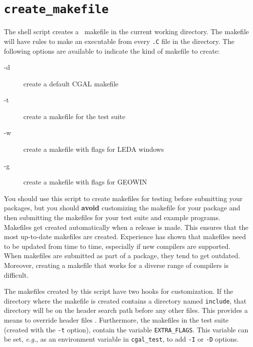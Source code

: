 \section{{\tt create\_makefile}}
\label{sec:create_makefile}

The shell script  creates a \cgal\ makefile
in the current working directory.
The makefile will have rules to make an executable from every {\tt .C} 
file in the directory.  The following options are available 
to indicate the kind of makefile to create:
\begin{description}
\item[-d]   create a default CGAL makefile
\item[-t]   create a makefile for the test suite
\item[-w]   create a makefile with flags for LEDA windows
\item[-g]   create a makefile with flags for GEOWIN
\end{description}

You should use this script to create makefiles for testing before submitting
your packages, but you should {\bf avoid} customizing the makefile for your 
package and then submitting the makefiles for your test suite and example 
programs.
Makefiles get created automatically when a release is made. This ensures 
that the most up-to-date makefiles are created. Experience has shown
that makefiles need to be updated from time to time, especially if new
compilers are supported. When makefiles are submitted as part of a package,
they tend to get outdated.
Moreover, creating a makefile that works for a diverse range of compilers
is difficult.

The makefiles created by this script have two hooks for customization. 
If the directory
where the makefile is created contains a directory named {\tt include},%
that
directory will be on the header search path before any other files. This
provides a means to override header files%
. 
Furthermore, the makefiles in the
test suite (created with the {\tt -t} option), contain the variable 
{\tt EXTRA\_FLAGS}.%
This variable can be set, {\em e.g.}, as an environment variable in 
{\tt cgal\_test}, to add {\tt -I} or {\tt -D} options.


